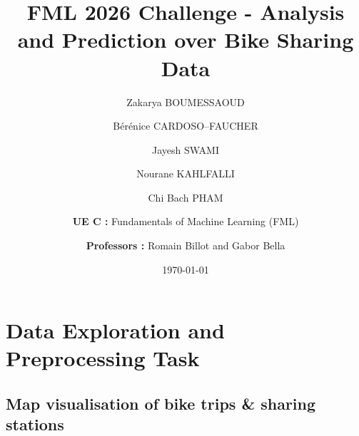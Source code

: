 \documentclass[11pt,a4paper,english]{article}
\begin{document}
\pagestyle{fancy}





\title{FML 2026 Challenge - Analysis and Prediction over Bike Sharing Data}

\author{
        \vspace{0.8cm}
    Zakarya BOUMESSAOUD \and
    Bérénice CARDOSO--FAUCHER \and
    Jayesh SWAMI\and
    Nourane KAHLFALLI\and
    Chi Bach PHAM \and
    \and
        \textbf{UE C :} Fundamentals of Machine Learning (FML) \and
        \textbf{Professors :} Romain Billot and Gabor Bella \and
}


\date{\today}

\IMTAfrontcover
\pagestyle{IMTAfancy} %

\IMTAsommaire
\newpage
\normalfont\normalsize

\section{Data Exploration and Preprocessing Task}
\subsection{Map visualisation of bike trips \& sharing stations}
\end{document}
